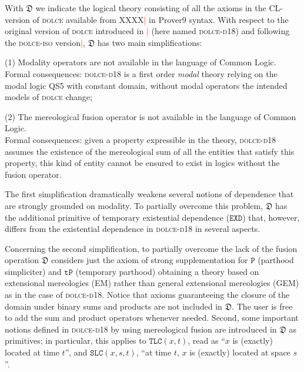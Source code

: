 \documentclass[ao]{iosart2x}
\newcommand{\nb}[1]{\textcolor{red}{$|$}\marginpar{\hspace*{-0cm}\parbox{20mm}{\scriptsize\raggedright\textcolor{red}{#1}}}}
\newcommand{\bflist}{\begin{list}{}{\setlength{\topsep}{2mm}\setlength{\parsep}{0mm}\setlength{\leftmargin}{9.2mm}\setlength{\labelwidth}{8mm}}}
\newcommand{\eflist}{\end{list}}
\newcommand{\dolceDefLabel}{\textrm{d$_\texttt{d}$}}
\newcommand{\refdolcedf}[1]{({\dolceDefLabel}\ref{#1})}
\newcommand{\pr}[1]{\mathtt{#1}}
\newcommand{\dolce}{{\textsc{dolce}}}
\newcommand{\dolceorig}{{\textsc{dolce-d{\footnotesize 18}}}}
\newcommand {\thdolce} {\ensuremath{\mathfrak{D}}}
\newcommand {\TPd} {\ensuremath{\pr{tP}}}
\newcommand {\Pd} {\ensuremath{\pr{P}}}
\newcommand {\SDd} {\ensuremath{\pr{SD}}}
\newcommand {\EXDd} {\ensuremath{\pr{EXD}}}
\newcommand {\SLCd} {\ensuremath{\pr{SLC}}}
\newcommand {\TLCd} {\ensuremath{\pr{TLC}}}
\begin{document}
%
%
%
With $\thdolce$ we indicate the logical theory consisting of all the axioms in the CL-version of {\dolce} available from XXXX\nb{add sito web} in Prover9 syntax. With respect to the original version of {\dolce} introduced in \cite{D18}\nb{CM: cita deliverable} (here named {\dolceorig}) and following the {\dolce-\textsc{iso}} version\nb{CM: non so se vogliamo fare riferimento alla versione iso o meno}, $\thdolce$ has two main simplifications:
\bflist
\item[(1)] Modality operators are not available in the language of Common Logic.\\ 
Formal consequences: {\dolceorig} is a first order {\em modal} theory relying on the modal logic QS5 with constant domain, without modal operators the intended models of {\dolce} change; 
\item[(2)] The mereological fusion operator is not available in the language of Common Logic.\\ 
Formal consequences: given a property expressible in the theory,  {\dolceorig} assumes the existence of the mereological sum of all the entities that satisfy this property, this kind of entity cannot be ensured to exist in logics without the fusion operator.
\eflist

The first simplification dramatically weakens several notions of dependence that are strongly grounded on modality. To partially overcome this problem, $\thdolce$ has the additional primitive of temporary existential dependence ($\EXDd$) that, however, differs from the existential dependence in  {\dolceorig} in several aspects. %

Concerning the second simplification, to partially overcome the lack of the fusion operation $\thdolce$ considers just the axiom of strong supplementation for $\Pd$ (parthood simpliciter) and $\TPd$ (temporary parthood) obtaining a theory based on extensional mereologies (EM) rather than general extensional mereologies (GEM) as in the case of {\dolceorig}. 
Notice that axioms guaranteeing the closure of the domain under binary sums and products are not included in $\thdolce$. The user is free to add the sum and product operators whenever needed. Second, some important notions defined in {\dolceorig} by using mereological fusion are introduced in $\thdolce$ as primitives; in particular, this applies to $\TLCd(x,t)$, read as ``$x$ is (exactly) located at time $t$'', and $\SLCd(x,s,t)$, ``at time $t$, $x$ is (exactly) located at space $s$''.
\end{document}
